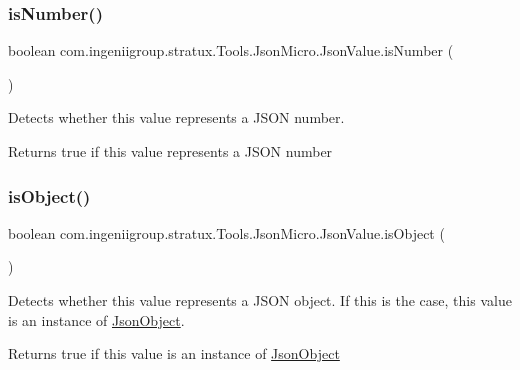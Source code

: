 \subsubsection{\texorpdfstring{is\+Number()}{isNumber()}}
{\footnotesize\ttfamily boolean com.\+ingeniigroup.\+stratux.\+Tools.\+Json\+Micro.\+Json\+Value.\+is\+Number (\begin{DoxyParamCaption}{ }\end{DoxyParamCaption})}

Detects whether this value represents a J\+S\+ON number.

\begin{DoxyReturn}{Returns}
{\ttfamily true} if this value represents a J\+S\+ON number 
\end{DoxyReturn}
\mbox{\label{classcom_1_1ingeniigroup_1_1stratux_1_1_tools_1_1_json_micro_1_1_json_value_a1c10b276446f8e86f600dd5ac96dcd9d}} 
\subsubsection{\texorpdfstring{is\+Object()}{isObject()}}
{\footnotesize\ttfamily boolean com.\+ingeniigroup.\+stratux.\+Tools.\+Json\+Micro.\+Json\+Value.\+is\+Object (\begin{DoxyParamCaption}{ }\end{DoxyParamCaption})}

Detects whether this value represents a J\+S\+ON object. If this is the case, this value is an instance of \hyperlink{classcom_1_1ingeniigroup_1_1stratux_1_1_tools_1_1_json_micro_1_1_json_object}{Json\+Object}.

\begin{DoxyReturn}{Returns}
{\ttfamily true} if this value is an instance of \hyperlink{classcom_1_1ingeniigroup_1_1stratux_1_1_tools_1_1_json_micro_1_1_json_object}{Json\+Object} 
\end{DoxyReturn}
\mbox{\label{classcom_1_1ingeniigroup_1_1stratux_1_1_tools_1_1_json_micro_1_1_json_value_ab9a440737894433864f67405794892ab}} 
